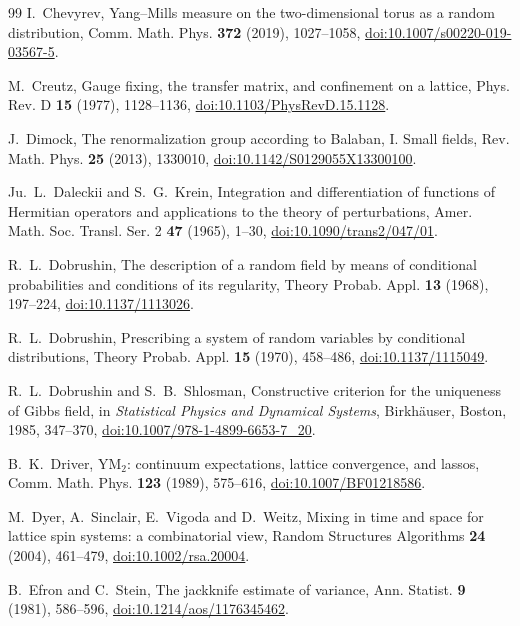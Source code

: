 \documentclass[aps,prd,twocolumn,superscriptaddress,nofootinbib,longbibliography,floatfix,amsmath,amssymb,10pt]{revtex4-2}
\theoremstyle{definition}
\theoremstyle{remark}
\begin{document}
\begin{thebibliography}{99}
I.~Chevyrev, Yang--Mills measure on the two-dimensional torus as a random
distribution, Comm. Math. Phys. \textbf{372} (2019), 1027--1058,
\href{https://doi.org/10.1007/s00220-019-03567-5}{doi:10.1007/s00220-019-03567-5}.

M.~Creutz, Gauge fixing, the transfer matrix, and confinement on a lattice,
Phys. Rev. D \textbf{15} (1977), 1128--1136,
\href{https://doi.org/10.1103/PhysRevD.15.1128}{doi:10.1103/PhysRevD.15.1128}.

J.~Dimock, The renormalization group according to Balaban, I. Small fields, Rev. Math. Phys. \textbf{25} (2013), 1330010, \href{https://doi.org/10.1142/S0129055X13300100}{doi:10.1142/S0129055X13300100}.

Ju.~L.~Daleckii and S.~G.~Krein, Integration and differentiation of
functions of Hermitian operators and applications to the theory of
perturbations, Amer. Math. Soc. Transl. Ser. 2 \textbf{47} (1965), 1--30,
\href{https://doi.org/10.1090/trans2/047/01}{doi:10.1090/trans2/047/01}.

R.~L.~Dobrushin, The description of a random field by means of conditional
probabilities and conditions of its regularity, Theory Probab. Appl.
\textbf{13} (1968), 197--224,
\href{https://doi.org/10.1137/1113026}{doi:10.1137/1113026}.

R.~L.~Dobrushin, Prescribing a system of random variables by conditional
distributions, Theory Probab. Appl. \textbf{15} (1970), 458--486,
\href{https://doi.org/10.1137/1115049}{doi:10.1137/1115049}.

R.~L.~Dobrushin and S.~B.~Shlosman, Constructive criterion for the uniqueness
of Gibbs field, in \emph{Statistical Physics and Dynamical Systems},
Birkh\"auser, Boston, 1985, 347--370,
\href{https://doi.org/10.1007/978-1-4899-6653-7_20}{doi:10.1007/978-1-4899-6653-7\_20}.

B.~K.~Driver, YM$_2$: continuum expectations, lattice convergence, and lassos, Comm. Math. Phys. \textbf{123} (1989), 575--616, \href{https://doi.org/10.1007/BF01218586}{doi:10.1007/BF01218586}.

M.~Dyer, A.~Sinclair, E.~Vigoda and D.~Weitz, Mixing in time and space for
lattice spin systems: a combinatorial view, Random Structures Algorithms
\textbf{24} (2004), 461--479,
\href{https://doi.org/10.1002/rsa.20004}{doi:10.1002/rsa.20004}.

B.~Efron and C.~Stein, The jackknife estimate of variance, Ann. Statist. \textbf{9} (1981), 586--596, \href{https://doi.org/10.1214/aos/1176345462}{doi:10.1214/aos/1176345462}.


\end{thebibliography}
\end{document}
